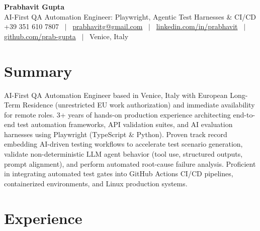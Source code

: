 \documentclass[a4paper,10pt]{article}
\begin{document}
\begin{minipage}[c]{0.80\textwidth}
 {\Huge\bfseries Prabhavit Gupta}\\[3pt]
 {\color{accent}\large AI-First QA Automation Engineer: Playwright, Agentic Test Harnesses \& CI/CD}\\[6pt]
 {\footnotesize +39 351 610 7807 ~$\vert$~
 \href{mailto:prabhavitg@gmail.com}{prabhavitg@gmail.com} ~$\vert$~
 \href{https://www.linkedin.com/in/prabhavit/}{linkedin.com/in/prabhavit} ~$\vert$~
 \href{https://github.com/prab-gupta}{github.com/prab-gupta} ~$\vert$~
 Venice, Italy}
\end{minipage}\hfill

\section{Summary}
AI-First QA Automation Engineer based in Venice, Italy with European Long-Term Residence (unrestricted EU work authorization) and immediate availability for remote roles. 3+ years of hands-on production experience architecting end-to-end test automation frameworks, API validation suites, and AI evaluation harnesses using Playwright (TypeScript \& Python). Proven track record embedding AI-driven testing workflows to accelerate test scenario generation, validate non-deterministic LLM agent behavior (tool use, structured outputs, prompt alignment), and perform automated root-cause failure analysis. Proficient in integrating automated test gates into GitHub Actions CI/CD pipelines, containerized environments, and Linux production systems.

\section{Experience}
\end{document}
